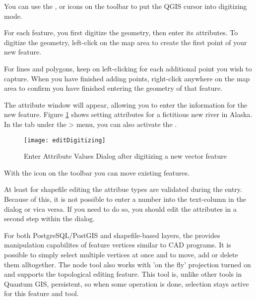 You can use the ,
 or
 icons on the toolbar to
put the QGIS cursor into digitizing mode.  

For each feature, you first digitize the geometry, then enter its attributes.
To digitize the geometry, left-click on the map area to create the first
point of your new feature.

For lines and polygons, keep on left-clicking for each additional
point you wish to capture.  When you have finished adding points,
right-click anywhere on the map area to confirm you have finished entering
the geometry of that feature.

The attribute window will appear, allowing you to enter the information for
the new feature. Figure \ref{fig:vector_digitising} shows setting attributes
for a fictitious new river in Alaska. In the  tab under the
 > menu, you can also activate the 
.

\begin{figure}[ht]
   \centering
   \caption{Enter Attribute Values Dialog after digitizing a new vector
   feature \nixcaption}\label{fig:vector_digitising}
   \texttt{[image: editDigitizing]}
 \end{figure}

With the  icon on the toolbar
you can move existing features.

\begin{Tip}\caption{\textsc{Attribute Value Types}}
At least for shapefile editing the attribue types are validated during the
entry. Because of this, it is not possible to enter a number into the text-column in
the dialog  or vica versa. If you need to do so,
you should edit the attributes in a second step within the  dialog.
\end{Tip}


For both PostgreSQL/PostGIS and shapefile-based layers, the 
 provides manipulation capabilites
of feature vertices similar to CAD programs. It is possible to simply select
multiple vertices at once and to move, add or delete them alltogether. The node
tool also works with 'on the fly' projection turned on and supports
the topological editing feature. This tool is, unlike other tools in Quantum GIS,
persistent, so when some operation is done, selection stays active for this
feature and tool.


